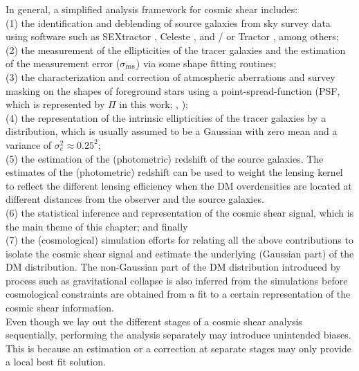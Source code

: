 In general, a simplified analysis framework for cosmic shear includes: \\ 
(1) the identification and deblending of source galaxies from sky survey data 
using software such as {\sc SEXtractor} \citep{Bertin1996}, {\sc Celeste}
\citep{Regier2014}, and / or {\sc Tractor} \citep{Lang2010}, among others;\\
(2) the measurement of the ellipticities of the tracer galaxies  
and the estimation of the measurement error ($\sigma_{\rm
ms}$) via some shape fitting routines; \\
(3) the characterization and correction of atmospheric aberrations and survey masking 
on the shapes of foreground stars using
 a point-spread-function (PSF, which is represented by $\Pi$ in this work; \citealt{Jee2013a}, \citealt{Rowe2010}); \\
(4) the representation of the intrinsic ellipticities of the tracer galaxies by a
distribution, which is usually assumed to be a Gaussian with zero mean
and a variance of $\sigma_e^2 \approx 0.25^2$;\\ 
(5) the estimation of the (photometric) redshift of the source galaxies. The 
estimates of the (photometric) redshift can be used to weight the lensing kernel
to reflect the different lensing efficiency when the DM overdensities 
are located at different distances from the observer and the source galaxies.
\\
(6) the statistical inference and representation of the cosmic shear signal,
which is the main theme of this chapter;
and finally \\
(7) the (cosmological) simulation efforts 
for relating all the above contributions to isolate the cosmic shear signal and
estimate the underlying (Gaussian part) of the DM distribution. 
The non-Gaussian part of the DM distribution introduced by process
such as gravitational collapse is also inferred from the simulations before    
cosmological constraints are obtained from a fit to a certain representation of
the cosmic shear information.\\ 
Even though we lay out the different stages of a cosmic shear analysis sequentially,
performing the analysis separately may introduce unintended biases. This is
because an estimation or a correction at separate stages may only provide a local
best fit solution.   

